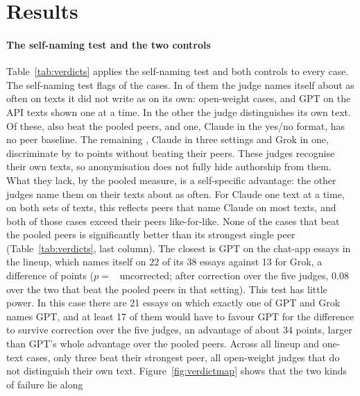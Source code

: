 \section{Results}
\label{sec:results}
\label{sec:frontier}
\label{sec:openweight}



\paragraph{The self-naming test and the two controls}
Table~\ref{tab:verdicts} applies the self-naming test and both controls to
every case. The self-naming test flags \CVflagged{} of the \CVcells{} cases.
In \CVfailFA{} of them the judge names itself about as often on texts it did
not write as on its own: \CVopenFlagged{} open-weight cases, and GPT on the API
texts shown one at a time. In the other \CVdisc{} the judge distinguishes its
own text. Of these, \CVbothAttr{} also beat the pooled peers, and one, Claude in
the yes/no format, has no peer baseline. The remaining \CVfailPeer{}, Claude in
three settings and Grok in one, discriminate by \FXGrokLineupDisc{} to
\CXClaudeChatSingleDisc{} points without beating their peers. These judges
recognise their own texts, so anonymisation does not fully hide authorship
from them. What they lack, by the pooled measure, is a self-specific
advantage: the other judges name them on their texts about as often. For Claude
one text at a time, on both sets of texts, this reflects peers that name Claude
on most texts, and both of those cases exceed their peers like-for-like. None of the \CVbothAttr{} cases that beat the pooled
peers is significantly better than its strongest single peer
(Table~\ref{tab:verdicts}, last column). The closest is GPT on the chat-app
essays in the lineup, which names itself on 22 of its 38 essays against 13 for
Grok, a difference of \CXGPTvsGrok{} points \CXGPTvsGrokCI{}
($p=$~\CXGPTvsGrokP{} uncorrected; \CXGPTvsGrokHolm{} after correction over
the five judges, 0.08 over the two that beat the pooled peers in that
setting). This test has little power. In this case there are 21 essays on
which exactly one of GPT and Grok names GPT, and at least 17 of them would have
to favour GPT for the difference to survive correction over the five judges,
an advantage of about 34 points, larger than GPT's whole advantage over the
pooled peers. Across all
\CVattr{} lineup and one-text cases, only three beat their strongest peer, all
open-weight judges that do not distinguish their own text.
Figure~\ref{fig:verdictmap} shows that the two kinds of failure lie along
